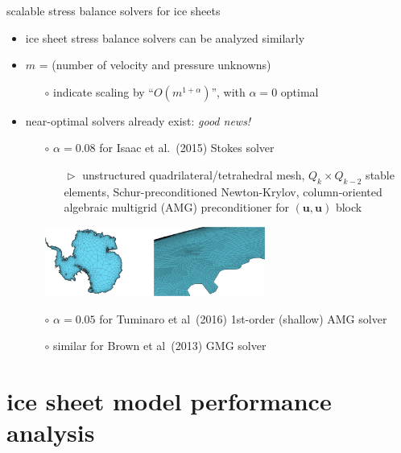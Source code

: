 \documentclass[svgnames,
               hyperref={colorlinks,citecolor=DeepPink4,linkcolor=FireBrick,urlcolor=Maroon},
               usepdftitle=false]  %
               {beamer}
\newcommand{\bu}{\mathbf{u}}
\begin{document}
\begin{frame}{scalable stress balance solvers for ice sheets}

\begin{itemize}
\item ice sheet stress balance solvers can be analyzed similarly
\item $m$ = (number of velocity and pressure unknowns)
    \begin{itemize}
    \item[$\circ$] indicate scaling by ``$O(m^{1+\alpha})$'', with $\alpha=0$ optimal
    \end{itemize}
\item \alert{near-optimal solvers} already exist: \hfill \emph{good news!}
    \begin{itemize}
    \item[$\circ$] $\alpha=0.08$ for Isaac et al.~(2015) Stokes solver
        \begin{itemize}
        \item[$\vartriangleright$] unstructured quadrilateral/tetrahedral mesh, $Q_k\times Q_{k-2}$ stable elements, Schur-preconditioned Newton-Krylov, column-oriented algebraic multigrid (AMG) preconditioner for $(\bu,\bu)$ block
        \end{itemize}

\begin{center}
\includegraphics[width=0.6\textwidth]{images/isaac-antarctica.png}
\end{center}
    \item[$\circ$] $\alpha=0.05$ for Tuminaro et al~(2016) 1st-order (shallow) AMG solver
    \item[$\circ$] similar for Brown et al~(2013) GMG solver
    \end{itemize}
\end{itemize}
\end{frame}



\section{ice sheet model performance analysis}
\end{document}
